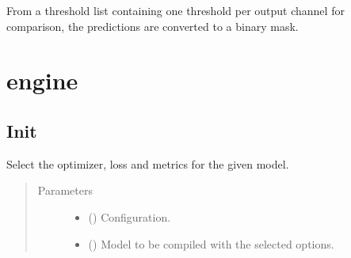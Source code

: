\documentclass[letterpaper,10pt,english]{sphinxmanual}
\begin{document}

\begin{fulllineitems}
\label{\detokenize{data/post_processing/smooth_tiled_predictions:data.post_processing.smooth_tiled_predictions.round_predictions}}
From a threshold list  containing one threshold per output
channel for comparison, the predictions are converted to a binary mask.

\end{fulllineitems}



\section{engine}
\label{\detokenize{engine/engine:engine}}\label{\detokenize{engine/engine::doc}}

\subsection{Init}
\label{\detokenize{engine/init:module-engine}}\label{\detokenize{engine/init:init}}\label{\detokenize{engine/init::doc}}

\begin{fulllineitems}
\label{\detokenize{engine/init:engine.prepare_optimizer}}
Select the optimizer, loss and metrics for the given model.
\begin{quote}\begin{description}
\item[{Parameters}] \leavevmode\begin{itemize}
\item {} 
 () \textendash{} Configuration.

\item {} 
 () \textendash{} Model to be compiled with the selected options.

\end{itemize}

\end{description}\end{quote}

\end{fulllineitems}
\end{document}
